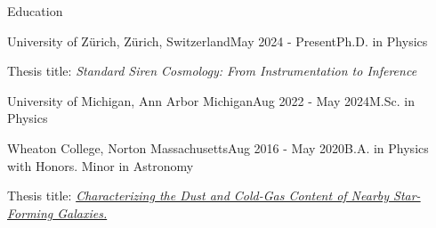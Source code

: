 \documentclass{resume} %
\begin{document}
\begin{rSection}{Education}
    \begin{rSubsection}
        {University of Zürich, Zürich, Switzerland}{May 2024 - Present}{Ph.D. in Physics}{}
        
        Thesis title: \textit{Standard Siren Cosmology: From Instrumentation to Inference}
    \end{rSubsection}
    
    \begin{rSubsection}
        {University of Michigan, Ann Arbor Michigan}{Aug 2022 - May 2024}{M.Sc. in Physics}{}
        
    \end{rSubsection}

\begin{rSubsection}{Wheaton College, Norton Massachusetts}{Aug 2016 - May 2020}{B.A. in Physics with Honors. Minor in Astronomy}{}

    Thesis title: \textit{\href{https://digitalrepository.wheatoncollege.edu/handle/11040/31192}{Characterizing the Dust and Cold-Gas Content of Nearby Star-Forming Galaxies.}}

\end{rSubsection}


\end{rSection}
\end{document}
